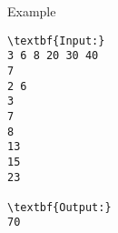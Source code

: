 Example
\begin{verbatim}
\textbf{Input:}
3 6 8 20 30 40
7
2 6
3
7
8
13
15
23

\textbf{Output:}
70
\end{verbatim}